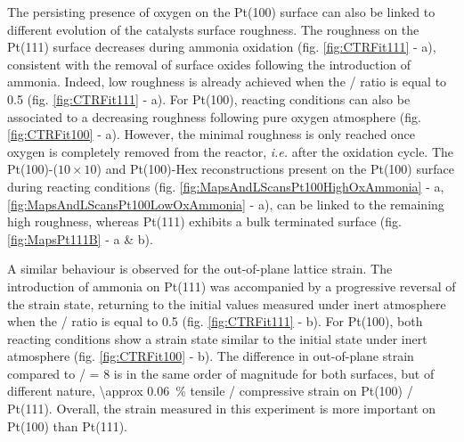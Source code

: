 The persisting presence of oxygen on the Pt(100) surface can also be linked to different evolution of the catalysts surface roughness.
The roughness on the Pt(111) surface decreases during ammonia oxidation (fig. \ref{fig:CTRFit111} - a), consistent with the removal of surface oxides following the introduction of ammonia.
Indeed, low roughness is already achieved when the / ratio is equal to \num{0.5} (fig. \ref{fig:CTRFit111} - a).
For Pt(100), reacting conditions can also be associated to a decreasing roughness following pure oxygen atmosphere (fig. \ref{fig:CTRFit100} - a).
However, the minimal roughness is only reached once oxygen is completely removed from the reactor, \textit{i.e.} after the oxidation cycle.
The  Pt(100)-($10\times10$) and Pt(100)-Hex reconstructions present on the Pt(100) surface during reacting conditions (fig. \ref{fig:MapsAndLScansPt100HighOxAmmonia} - a, \ref{fig:MapsAndLScansPt100LowOxAmmonia} - a), can be linked to the remaining high roughness, whereas Pt(111) exhibits a bulk terminated surface (fig. \ref{fig:MapsPt111B} - a \& b).

A similar behaviour is observed for the out-of-plane lattice strain.
The introduction of ammonia on Pt(111) was accompanied by a progressive reversal of the strain state, returning to the initial values measured under inert atmosphere when the / ratio is equal to \num{0.5} (fig. \ref{fig:CTRFit111} - b).
For Pt(100), both reacting conditions show a strain state similar to the initial state under inert atmosphere (fig. \ref{fig:CTRFit100} - b).
The difference in out-of-plane strain compared to / = 8 is in the same order of magnitude for both surfaces, but of different nature, \qty{\approx 0.06}{\percent} tensile / compressive strain on Pt(100) /  Pt(111).
Overall, the strain measured in this experiment is more important on Pt(100) than Pt(111).


